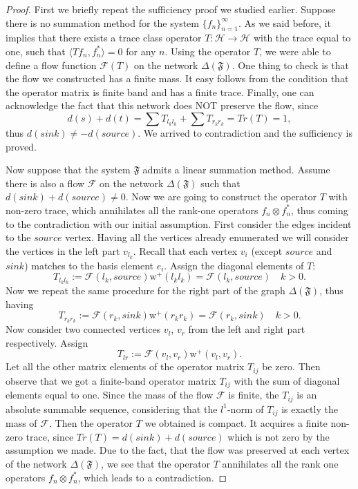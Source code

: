 \documentclass[12pt]{article}
\renewcommand{\cal}[1]{\mathcal{#1}}
\newcommand\inner[2]{\langle #1, #2 \rangle}
\theoremstyle{definition}
\newcommand{\seq}[1]{\{{#1}_n\}_{n=1}^\infty}
\newcommand{\fsys}{\mathfrak{F}}
\newcommand{\wtp}{\mathrm{w}^{+}}
\newcommand{\flow}{\mathcal{F}}
\newcommand{\flowsgn}{\flow}
\newcommand{\source}{\mathit{source}}
\newcommand{\sink}{\mathit{sink}}
\newcommand{\net}{\Delta}
\numberwithin{remark}{section}
\numberwithin{theorem}{section}
\numberwithin{prop}{section}
\numberwithin{equation}{section}
\numberwithin{lemma}{section}
\numberwithin{prop_under_lemma}{lemma}
\begin{document}
    \begin{proof}
      First we briefly repeat the sufficiency proof we studied earlier.
      Suppose there is no summation method for the system $\seq{f}$.
      As we said before, it implies that there exists a trace class operator $T : \cal{H} \to \cal{H}$ with
      the trace equal to one, such that $\inner{Tf_n}{f_n^*} = 0$ for any $n$.
      Using the operator $T$, we were able to define a flow function $\flow(T)$ on the network
      $\net(\fsys)$.
      One thing to check is that the flow we constructed has a finite mass.
      It easy follows from the condition that the operator matrix is finite band and has a finite trace.
      Finally, one can acknowledge the fact that this network does NOT preserve the flow, since
      $$
        d(s) + d(t) = \sum T_{l_k l_k} + \sum T_{r_k r_k} = Tr(T) = 1,
      $$
      thus $d(\sink) \neq -d(\source)$.
      We arrived to contradiction and the sufficiency is proved.

      Now suppose that the system $\fsys$ admits a linear summation method.
      Assume there is also a flow $\flow$ on the network $\net(\fsys)$ such that $d(\sink) + d(\source) \neq 0$.
      Now we are going to construct the operator $T$ with non-zero trace, which annihilates all the rank-one
      operators $f_n \otimes f^*_n$, thus coming to the contradiction with our initial assumption.
      First consider the edges incident to the $\source$ vertex.
      Having all the vertices already enumerated we will consider the vertices in the left part $v_{l_k}$.
      Recall that each vertex $v_i$ (except $\source$ and $\sink$) matches to the basis element $e_i$.
      Assign the diagonal elements of $T$:
      $$
        T_{l_k l_k} := \flow(l_k, \source) \wtp(l_k l_k) = \flow(l_k, \source) \quad k > 0.
      $$
      Now we repeat the same procedure for the right part of the graph $\net(\fsys)$, thus having
      $$
        T_{r_k r_k} := \flow(r_k, \sink) \wtp(r_k r_k) = \flow(r_k, \sink) \quad k > 0.
      $$
      Now consider two connected vertices $v_l$, $v_r$ from the left and right part
      respectively. Assign
      $$
        T_{lr} := \flowsgn(v_l, v_r) \wtp(v_l, v_r).
      $$
      Let all the other matrix elements of the operator matrix $T_{ij}$ be zero.
      Then observe that we got a finite-band operator matrix $T_{ij}$ with the sum of diagonal elements
      equal to one.
      Since the mass of the flow $\flow$ is finite, the $T_{ij}$ is an absolute summable sequence, considering that
        the $l^1$-norm of $T_{ij}$ is exactly the mass of $\flow$.
      Then the operator $T$ we obtained is compact.
      It acquires a finite non-zero trace, since $Tr(T) = d(\sink) + d(\source)$ which is not zero
        by the assumption we made.
      Due to the fact, that the flow was preserved at each vertex of the network $\net(\fsys)$,
        we see that the operator $T$ annihilates all the rank one operators $f_n \otimes f^*_n$,
        which leads to a contradiction.
    \end{proof}
    
\end{document}

